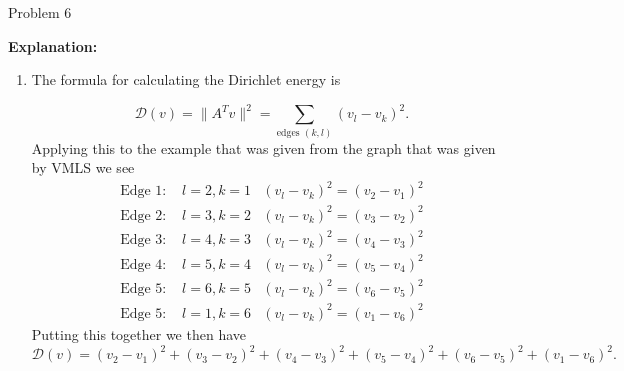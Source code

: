 \begin{problem}{Problem 6}
\begin{Highlight}
        \noindent \textbf{Explanation:}

        \begin{enumerate}[label = (\alph*), start = 3]
            \item The formula for calculating the Dirichlet energy is 
            
            \begin{equation*}
                \mathcal{D}(v) = \|A^{T}v\|^{2} = \sum_{\text{edges } (k,l)} (v_{l} - v_{k})^{2}.
            \end{equation*}
            Applying this to the example that was given from the graph that was given by VMLS we see
            \setcounter{equation}{0}
            \begin{align}
                \text{Edge 1: } & l = 2, k = 1 & (v_{l} - v_{k})^{2} = (v_{2} - v_{1})^{2} \\
                \text{Edge 2: } & l = 3, k = 2 & (v_{l} - v_{k})^{2} = (v_{3} - v_{2})^{2} \\
                \text{Edge 3: } & l = 4, k = 3 & (v_{l} - v_{k})^{2} = (v_{4} - v_{3})^{2} \\
                \text{Edge 4: } & l = 5, k = 4 & (v_{l} - v_{k})^{2} = (v_{5} - v_{4})^{2} \\
                \text{Edge 5: } & l = 6, k = 5 & (v_{l} - v_{k})^{2} = (v_{6} - v_{5})^{2} \\
                \text{Edge 5: } & l = 1, k = 6 & (v_{l} - v_{k})^{2} = (v_{1} - v_{6})^{2}
            \end{align}
            Putting this together we then have
            \begin{equation}
                \mathcal{D}(v) = (v_{2} - v_{1})^{2} + (v_{3} - v_{2})^{2} + (v_{4} - v_{3})^{2} + (v_{5} - v_{4})^{2} + (v_{6} - v_{5})^{2} + (v_{1} - v_{6})^{2}.
            \end{equation}
        \end{enumerate}
    \end{Highlight}
\end{problem}

